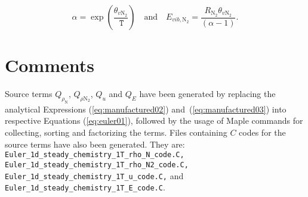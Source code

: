 \documentclass[10pt]{article}
\newcommand{\T}{\,\mathtt{T}}
\begin{document}
$$\alpha = \exp\left(\dfrac{\theta_{v \text{N}_2}}{\T}\right)\quad \mbox{and} \quad  E_{vib, \text{N}_2} = \dfrac{R_{\text{N}_2} \theta_{v \text{N}_2}}{(\alpha-1)}.$$







\section{Comments}


Source terms $Q_{\rho_\text{N} }$, $Q_{\rho \text{N}_{2}}$, $Q_u$ and $Q_E$ have been generated by replacing the analytical Expressions (\ref{eq:manufactured02}) and~(\ref{eq:manufactured03}) into respective Equations (\ref{eq:euler01}), followed by the usage of Maple commands for collecting, sorting and factorizing the terms. Files containing $C$ codes for the source terms have also been generated. They are: \texttt{ Euler\_1d\_steady\_chemistry\_1T\_rho\_N\_code.C, Euler\_1d\_steady\_chemistry\_1T\_rho\_N2\_code.C,\\ Euler\_1d\_steady\_chemistry\_1T\_u\_code.C,} and \texttt{Euler\_1d\_steady\_chemistry\_1T\_E\_code.C}.
\end{document}
